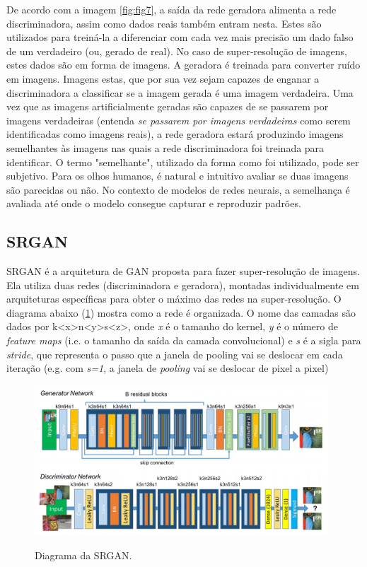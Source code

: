 De acordo com a imagem \ref{fig:fig7}, a saída da rede geradora alimenta a rede discriminadora, assim como dados reais também entram nesta. Estes são utilizados para treiná-la a diferenciar com cada vez mais precisão um dado falso de um verdadeiro (ou, gerado de real). No caso de super-resolução de imagens, estes dados são em forma de imagens. A geradora é treinada para converter ruído em imagens. Imagens estas, que por sua vez sejam capazes de enganar a discriminadora a classificar se a imagem gerada é uma imagem verdadeira. Uma vez que as imagens artificialmente geradas são capazes de se passarem por imagens verdadeiras (entenda \textit{se passarem por imagens verdadeiras} como serem identificadas como imagens reais), a rede geradora estará produzindo imagens semelhantes às imagens nas quais a rede discriminadora foi treinada para identificar. O termo "semelhante", utilizado da forma como foi utilizado, pode ser subjetivo. Para os olhos humanos, é natural e intuitivo avaliar se duas imagens são parecidas ou não. No contexto de modelos de redes neurais, a semelhança é avaliada até onde o modelo consegue capturar e reproduzir padrões.

\subsection{SRGAN}

SRGAN é a arquitetura de GAN proposta para fazer super-resolução de imagens. Ela utiliza duas redes (discriminadora e geradora), montadas individualmente em arquiteturas específicas para obter o máximo das redes na super-resolução. O diagrama abaixo (\ref{fig:fig8}) mostra como a rede é organizada. O nome das camadas são dados por k<x>n<y>s<z>, onde \textit{x} é o tamanho do kernel, \textit{y} é o número de \textit{feature maps} (i.e. o tamanho da saída da camada convolucional) e \textit{s} é a sigla para \textit{stride}, que representa o passo que a janela de pooling vai se deslocar em cada iteração (e.g. com \textit{s=1}, a janela de \textit{pooling} vai se deslocar de pixel a pixel) 

\begin{figure}[H]
    \centering
    \caption{Diagrama da SRGAN.}
    \includegraphics[width=11cm]{fig/SRGAN.png}
    \label{fig:fig8}
\end{figure}

